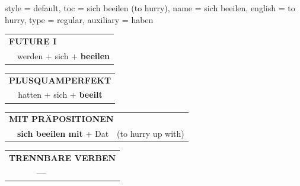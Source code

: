 \begin{verbentry}{
  style = {default},
  toc = {sich beeilen (to hurry)},
  name = {sich beeilen},
  english = {to hurry},
  type = {regular},
  auxiliary = {haben}
}
\begin{tabular}{rl}
    \multicolumn{2}{l}{\textbf{FUTURE I} }\\
    &werden + sich + \textbf{beeilen}\\
 
  \end{tabular}
\hfill
   \begin{tabular}{rl}
      \multicolumn{2}{l}{\textbf{PLUSQUAMPERFEKT}}\\
    &hatten + sich + \textbf{beeilt}\\
  \end{tabular}
  
\vspace{10pt}

   \begin{tabular}{lll}
      \multicolumn{3}{l}{\textbf{MIT PRÄPOSITIONEN}}\\
& \textbf{sich beeilen mit} + Dat & (to hurry up with)
  \end{tabular}
\hfill
\begin{tabular}{lll}
\multicolumn{3}{l}{\textbf{TRENNBARE VERBEN}}\\
& \textbf{---} & \\
\end{tabular}
  
  \vspace{-5pt}
\end{verbentry}

